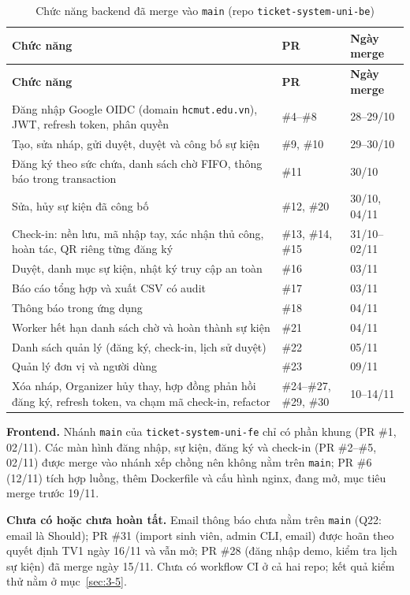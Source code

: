 \begingroup\tblsetup\tblzebra
\begin{longtable}{L{6.4cm}L{3.4cm}L{3.2cm}}
\caption{Chức năng backend đã merge vào \texttt{main} (repo \texttt{ticket-system-uni-be})}\label{tab:backend-merged}\\
\toprule
{}\textbf{Chức năng} & \textbf{PR} & \textbf{Ngày merge} \\
\midrule
\endfirsthead
\toprule
{}\textbf{Chức năng} & \textbf{PR} & \textbf{Ngày merge} \\
\midrule
\endhead
\bottomrule
\endlastfoot
Đăng nhập Google OIDC (domain \texttt{hcmut.edu.vn}), JWT, refresh token, phân quyền & \#4--\#8 & 28--29/10 \\
Tạo, sửa nháp, gửi duyệt, duyệt và công bố sự kiện & \#9, \#10 & 29--30/10 \\
Đăng ký theo sức chứa, danh sách chờ FIFO, thông báo trong transaction & \#11 & 30/10 \\
Sửa, hủy sự kiện đã công bố & \#12, \#20 & 30/10, 04/11 \\
Check-in: nền lưu, mã nhập tay, xác nhận thủ công, hoàn tác, QR riêng từng đăng ký & \#13, \#14, \#15 & 31/10--02/11 \\
Duyệt, danh mục sự kiện, nhật ký truy cập an toàn & \#16 & 03/11 \\
Báo cáo tổng hợp và xuất CSV có audit & \#17 & 03/11 \\
Thông báo trong ứng dụng & \#18 & 04/11 \\
Worker hết hạn danh sách chờ và hoàn thành sự kiện & \#21 & 04/11 \\
Danh sách quản lý (đăng ký, check-in, lịch sử duyệt) & \#22 & 05/11 \\
Quản lý đơn vị và người dùng & \#23 & 09/11 \\
Xóa nháp, Organizer hủy thay, hợp đồng phản hồi đăng ký, refresh token, va chạm mã check-in, refactor & \#24--\#27, \#29, \#30 & 10--14/11 \\
\end{longtable}
\endgroup

\textbf{Frontend.} Nhánh \texttt{main} của \texttt{ticket-system-uni-fe} chỉ có phần khung (PR \#1, 02/11). Các màn hình đăng nhập, sự kiện, đăng ký và check-in (PR \#2--\#5, 02/11) được merge vào nhánh xếp chồng nên không nằm trên \texttt{main}; PR \#6 (12/11) tích hợp luồng, thêm Dockerfile và cấu hình nginx, đang mở, mục tiêu merge trước 19/11.

\textbf{Chưa có hoặc chưa hoàn tất.} Email thông báo chưa nằm trên \texttt{main} (Q22: email là Should); PR \#31 (import sinh viên, admin CLI, email) được hoãn theo quyết định TV1 ngày 16/11 và vẫn mở; PR \#28 (đăng nhập demo, kiểm tra lịch sự kiện) đã merge ngày 15/11. Chưa có workflow CI ở cả hai repo; kết quả kiểm thử nằm ở mục~\ref{sec:3-5}.

